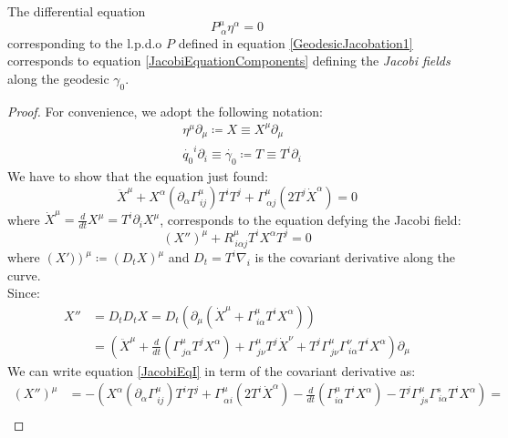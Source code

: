 \documentclass[Main]{subfiles}
\begin{document}
	
	\begin{proposition}
		The differential equation $$P^\mu_{\: \alpha} \eta^\alpha=0$$ corresponding to the l.p.d.o $P$ defined in equation \ref{GeodesicJacobation1} corresponds to equation \ref{JacobiEquationComponents} defining  the \emph{Jacobi fields} along the geodesic $\gamma_0$.
	\end{proposition}
	\begin{proof}
		For convenience, we adopt the following notation:
		\begin{align*}
		&\eta^\mu \partial_\mu \coloneqq X \equiv X^\mu \partial_\mu \\
		&\dot{q_0}^i \partial_i \equiv \dot{\gamma_0} \coloneqq T \equiv T^i \partial_i
		\end{align*}
		We have to show that the equation just found:
		\begin{equation}\label{JacobiEqI}
			\ddot{X}^\mu + X^\alpha\left(\partial_\alpha\Gamma^{\mu}_{\, i j}\right)T^i T^j + \Gamma^\mu_{\, \alpha j}\left(2 T^j \dot{X}^\alpha \right) = 0
		\end{equation}
		where $\dot{X}^\mu = \frac{d}{dt}X^\mu= T^i \partial_i X^\mu$,
		corresponds to the equation defying the Jacobi field:
		\begin{equation}\label{JacobiEqII}
			\left(X'' \right)^\mu + R^\mu_{\, i \alpha j}T^i X^\alpha T^j = 0
		\end{equation}
		where $\left(X')\right)^\mu \coloneqq \left(D_t X \right)^\mu$ and $D_t = T^i \nabla_i$ is the covariant derivative along the curve.\\
		Since:
		\begin{align}\label{JacobiEqDerivative}
			X'' &= D_t D_t X = D_t \left( \partial_\mu \left( \dot{X}^\mu + \Gamma^\mu_{\, i \alpha} T^i X^\alpha \right)\right) \nonumber \\
			&=\left( \ddot{X}^\mu + \frac{d}{dt}\left( \Gamma^\mu_{\, j \alpha} T^j X^\alpha \right) + \Gamma^\mu_{\, j \nu}T^j \dot{X}^\nu + T^j \Gamma^\mu_{\, j \nu} \Gamma^\nu_{\, i \alpha} T^i X^\alpha \right)\partial_\mu
		\end{align}
		We can write equation \ref{JacobiEqI} in term of the covariant derivative as:
		\begin{align*}
			\left(X'' \right)^\mu &=
			- \left(
			X^\alpha\left(\partial_\alpha\Gamma^{\mu}_{\, i j}\right)T^i T^j + \Gamma^\mu_{\, \alpha i}\left(2 T^i \dot{X}^\alpha \right)
			- \frac{d}{dt}\left( \Gamma^\mu_{i \alpha} T^i X^\alpha \right) - T^j \Gamma^\mu_{\, j s} \Gamma^s_{\, i \alpha} T^i X^\alpha
			\right) =\\

\end{align*}
\end{proof}
\end{document}
